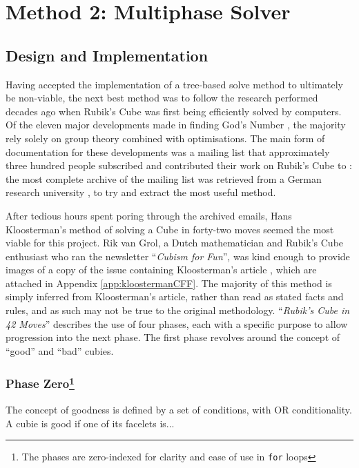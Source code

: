 \documentclass{report}
\newcommand{\tit}[1]{\textit{#1}}
\newcommand{\propernoun}[1]{\enquote{\tit{#1}}}
\begin{document}
	\section{Method 2: Multiphase Solver} \label{sec:multiphaseSolving}
	
	\subsection{Design and Implementation}
	
	Having accepted the implementation of a tree-based solve method to ultimately be non-viable, the next best method was to follow the research performed decades ago when Rubik's Cube was first being efficiently solved by computers. Of the eleven major developments made in finding God's Number \cite{Rokicki2010}, the majority rely solely on group theory combined with optimisations. The main form of documentation for these developments was a mailing list that approximately three hundred people subscribed and contributed their work on Rubik's Cube to \cite{Schoenert1996}: the most complete archive of the mailing list was retrieved from a German research university \cite{Schoenert1996}, \cite{RWTHAachenUniversity} to try and extract the most useful method.
	
	After tedious hours spent poring through the archived emails, Hans Kloosterman's method of solving a Cube in forty-two moves seemed the most viable for this project. Rik van Grol, a Dutch mathematician and Rubik's Cube enthusiast who ran the newsletter \propernoun{Cubism for Fun}, was kind enough to provide images of a copy of the issue containing Kloosterman's article \cite{Kloosterman1990}, which are attached in Appendix \ref{app:kloostermanCFF}.	The majority of this method is simply inferred from Kloosterman's article, rather than read as stated facts and rules, and as such may not be true to the original methodology. \propernoun{Rubik's Cube in 42 Moves} describes the use of four phases, each with a specific purpose to allow progression into the next phase. The first phase revolves around the concept of \enquote{good} and \enquote{bad} cubies. 
	
	\subsubsection[Phase Zero]{Phase Zero\protect\footnote{The phases are zero-indexed for clarity and ease of use in \lstinline|for| loops}}
	
	The concept of goodness is defined by a set of conditions, with OR conditionality. A cubie is good if one of its facelets is...
	
\end{document}
